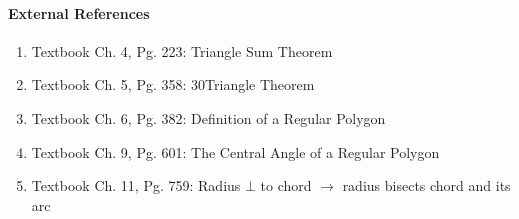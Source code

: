 \documentclass[letterpaper,12pt,twoside]{report}
\begin{document}
	\paragraph{External References}
	
	\begin{enumerate}
		\item Textbook Ch. 4, Pg. 223: Triangle Sum Theorem
		\item Textbook Ch. 5, Pg. 358: 30\textdegree \space Triangle Theorem
		\item Textbook Ch. 6, Pg. 382: Definition of a Regular Polygon
		\item Textbook Ch. 9, Pg. 601: The Central Angle of a Regular Polygon
		\item Textbook Ch. 11, Pg. 759: Radius $\bot$ to chord $\rightarrow$ radius bisects chord and its arc
	\end{enumerate}
\end{document}
